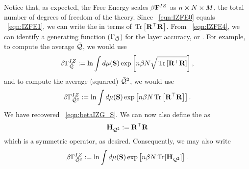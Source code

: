 Notice that, as expected, the Free Energy scales $\beta\mathbf{F}^{IZ}$ as $n \times N \times M$, the total number of degrees of freedom of the theory.
\noindent
Since \EQN~\ref{eqn:IZFE0} equals \EQN~\ref{eqn:IZFE1}, we can write the \FreeEnergy in terms of $\mbox{}\operatorname{Tr}\left[\mathbf{R}^{\top}\mathbf{R}\right]$. From \EQN~\ref{eqn:IZFE4}, 
we can identify a generating function ($\Gamma_{\bar{\mathcal{Q}}}$) for the layer accuracy, or \Quality.
For example, to compute the average \Quality $\bar{\mathcal{Q}}$, we would use
\begin{align}
  \label{eqn:IZG_Q}
  \beta\Gamma^{IZ}_{\bar{\mathcal{Q}}} :=  \ln \int d\mu(\mathbf{S}) \exp\left[n\beta N\sqrt{\mbox{}\operatorname{Tr}\left[\mathbf{R}^{\top}\mathbf{R}\right]}\right],
\end{align}
and to compute the average \Quality (squared) $\bar{\mathcal{Q}}^{2}$, we would use
\begin{align}
    \label{eqn:IZG_QT2}
  \beta\Gamma^{IZ}_{\bar{\mathcal{Q}}^{2}} :=  \ln \int d\mu(\mathbf{S}) \exp\left[n\beta N\mbox{}\operatorname{Tr}\left[\mathbf{R}^{\top}\mathbf{R}\right]\right] .
\end{align}
We have recovered \EQN~\ref{eqn:betaIZG_S}.
We can now also define the \LayerQualitySquared \Hamiltonian as
\begin{equation}
      \label{eqn:HBARE}
  \mathbf{H}_{\bar{\mathcal{Q}}^{2}}:=\mathbf{R}^{\top}\mathbf{R}
\end{equation}
which is a symmetric operator, as desired.
Consequently, we may also write
\begin{align}
    \label{eqn:IZG_QT3}
  \beta\Gamma^{IZ}_{\bar{\mathcal{Q}}^{2}} :=  \ln \int d\mu(\mathbf{S}) \exp\left[n\beta N \operatorname{Tr}[\mathbf{H}_{\bar{\mathcal{Q}}^{2}}]\right]  .
\end{align}
